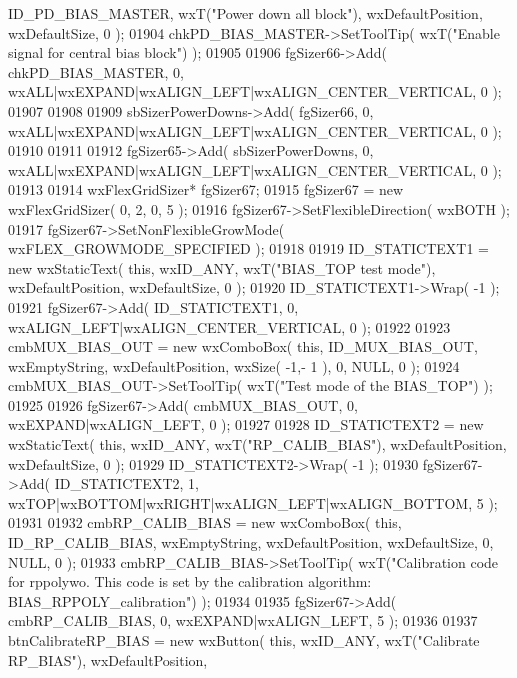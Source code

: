 \begin{DoxyCode}
      ID_PD_BIAS_MASTER, wxT(\textcolor{stringliteral}{"Power down all block"}), wxDefaultPosition, wxDefaultSize, 0 );
01904     chkPD_BIAS_MASTER->SetToolTip( wxT(\textcolor{stringliteral}{"Enable signal for central bias block"}) );
01905     
01906     fgSizer66->Add( chkPD_BIAS_MASTER, 0, wxALL|wxEXPAND|wxALIGN\_LEFT|wxALIGN\_CENTER\_VERTICAL, 0 );
01907     
01908     
01909     sbSizerPowerDowns->Add( fgSizer66, 0, wxALL|wxEXPAND|wxALIGN\_LEFT|wxALIGN\_CENTER\_VERTICAL, 0 );
01910     
01911     
01912     fgSizer65->Add( sbSizerPowerDowns, 0, wxALL|wxEXPAND|wxALIGN\_LEFT|wxALIGN\_CENTER\_VERTICAL, 0 );
01913     
01914     wxFlexGridSizer* fgSizer67;
01915     fgSizer67 = \textcolor{keyword}{new} wxFlexGridSizer( 0, 2, 0, 5 );
01916     fgSizer67->SetFlexibleDirection( wxBOTH );
01917     fgSizer67->SetNonFlexibleGrowMode( wxFLEX\_GROWMODE\_SPECIFIED );
01918     
01919     ID_STATICTEXT1 = \textcolor{keyword}{new} wxStaticText( \textcolor{keyword}{this}, wxID\_ANY, wxT(\textcolor{stringliteral}{"BIAS\_TOP test mode"}), wxDefaultPosition, 
      wxDefaultSize, 0 );
01920     ID_STATICTEXT1->Wrap( -1 );
01921     fgSizer67->Add( ID_STATICTEXT1, 0, wxALIGN\_LEFT|wxALIGN\_CENTER\_VERTICAL, 0 );
01922     
01923     cmbMUX_BIAS_OUT = \textcolor{keyword}{new} wxComboBox( \textcolor{keyword}{this}, ID_MUX_BIAS_OUT, wxEmptyString, wxDefaultPosition, wxSize( -1,-
      1 ), 0, NULL, 0 ); 
01924     cmbMUX_BIAS_OUT->SetToolTip( wxT(\textcolor{stringliteral}{"Test mode of the BIAS\_TOP"}) );
01925     
01926     fgSizer67->Add( cmbMUX_BIAS_OUT, 0, wxEXPAND|wxALIGN\_LEFT, 0 );
01927     
01928     ID_STATICTEXT2 = \textcolor{keyword}{new} wxStaticText( \textcolor{keyword}{this}, wxID\_ANY, wxT(\textcolor{stringliteral}{"RP\_CALIB\_BIAS"}), wxDefaultPosition, 
      wxDefaultSize, 0 );
01929     ID_STATICTEXT2->Wrap( -1 );
01930     fgSizer67->Add( ID_STATICTEXT2, 1, wxTOP|wxBOTTOM|wxRIGHT|wxALIGN\_LEFT|wxALIGN\_BOTTOM, 5 );
01931     
01932     cmbRP_CALIB_BIAS = \textcolor{keyword}{new} wxComboBox( \textcolor{keyword}{this}, ID_RP_CALIB_BIAS, wxEmptyString, wxDefaultPosition, 
      wxDefaultSize, 0, NULL, 0 ); 
01933     cmbRP_CALIB_BIAS->SetToolTip( wxT(\textcolor{stringliteral}{"Calibration code for rppolywo. This code is set by the calibration
       algorithm: BIAS\_RPPOLY\_calibration"}) );
01934     
01935     fgSizer67->Add( cmbRP_CALIB_BIAS, 0, wxEXPAND|wxALIGN\_LEFT, 5 );
01936     
01937     btnCalibrateRP_BIAS = \textcolor{keyword}{new} wxButton( \textcolor{keyword}{this}, wxID\_ANY, wxT(\textcolor{stringliteral}{"Calibrate RP\_BIAS"}), wxDefaultPosition, 

\end{DoxyCode}
